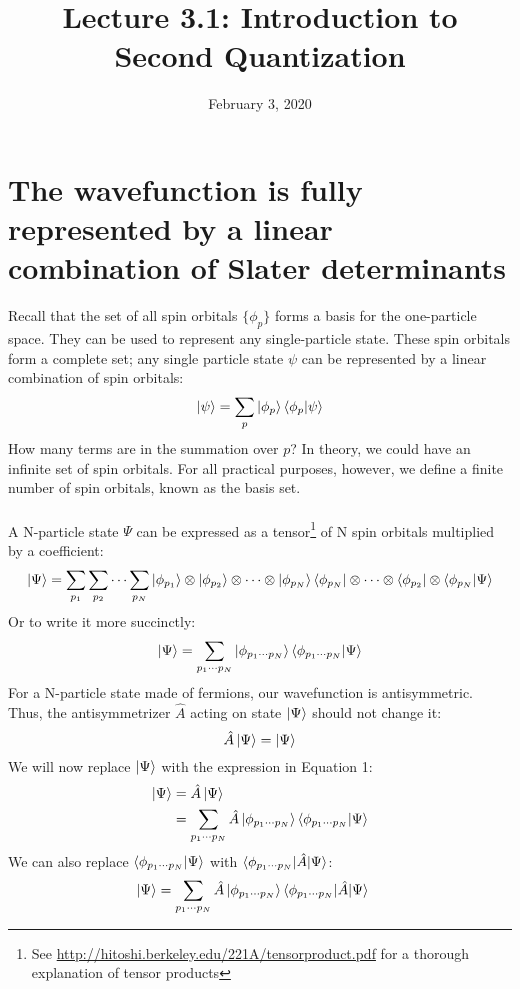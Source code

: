 \documentclass{article}
\title{Lecture 3.1: Introduction to Second Quantization}
\date{February 3, 2020}
\begin{document}
\maketitle
\noindent
\section{The wavefunction is fully represented by a linear combination of Slater determinants}
Recall that the set of all spin orbitals $\{\phi_p\}$ forms a basis for the one-particle space.
They can be used to represent any single-particle state.
These spin orbitals form a complete set; any single particle state $\psi$ can be represented by
a linear combination of spin orbitals:
\[\ket{\psi} = \sum_p \ket{\phi_p}\braket{\phi_p | \psi} \]
How many terms are in the summation over $p$? 
In theory, we could have an infinite set of spin orbitals.
For all practical purposes, however, we define a finite number of spin orbitals, known as the basis set. \\
\\
A N-particle state $\Psi$ can be expressed as a tensor\footnote{See \url{http://hitoshi.berkeley.edu/221A/tensorproduct.pdf} for a thorough explanation of tensor products} 
of N spin orbitals multiplied by a coefficient:
\[\ket{\Psi} = \sum_{p_1}\sum_{p_2}\cdots\sum_{p_N} \ket{\phi_{p_1}}\otimes \ket{\phi_{p_2}} \otimes \cdots \otimes \ket{\phi_{p_N}}  \bra{\phi_{p_N}}\otimes \cdots \otimes \bra{\phi_{p_2}} \otimes \braket{\phi_{p_N}  | \Psi} \]
Or to write it more succinctly: 
\begin{equation}
\ket{\Psi} = \sum_{p_1 \cdots p_N} \ket{\phi_{p_1 \cdots p_N}} \braket{\phi_{p_1 \cdots p_N} | \Psi} 
\end{equation}
For a N-particle state made of fermions, our wavefunction is antisymmetric.
Thus, the antisymmetrizer $\hat{A}$ acting on state $\ket{\Psi}$ should not change it: 
\[ \hat{A}\ket{\Psi} = \ket{\Psi} \]
We will now replace $\ket{\Psi}$ with the expression in Equation 1: 
\begin{align*}
\ket{\Psi} &=  \hat{A} \ket{\Psi}\\
&=\sum_{p_1 \cdots p_N}\hat{A} \ket{\phi_{p_1 \cdots p_N}} \braket{\phi_{p_1 \cdots p_N} | \Psi}  
\end{align*}
We can also replace $\braket{\phi_{p_1 \cdots p_N} | \Psi}$ with $\braket{\phi_{p_1 \cdots p_N} | \hat{A} | \Psi} $: 
\begin{align*}
\ket{\Psi} &=\sum_{p_1 \cdots p_N}\hat{A} \ket{\phi_{p_1 \cdots p_N}} \braket{\phi_{p_1 \cdots p_N} | \hat{A} | \Psi} 
\end{align*}
\end{document}
